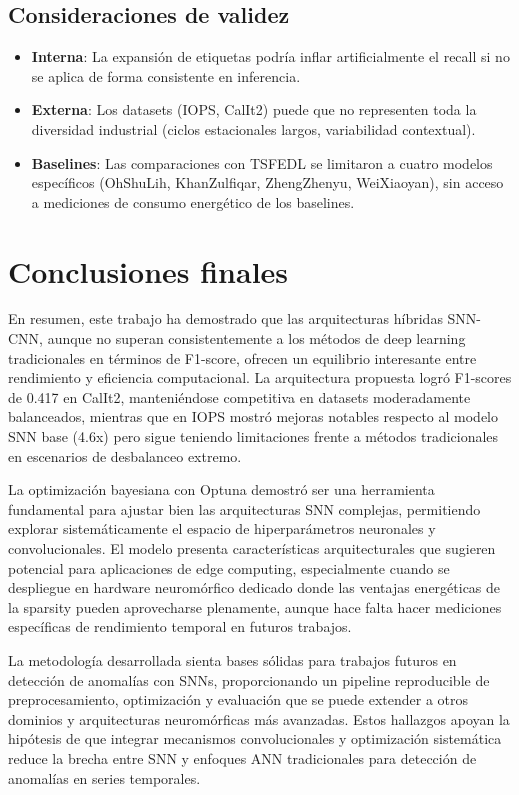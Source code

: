 \subsection{Consideraciones de validez}
\begin{itemize}
    \item \textbf{Interna}: La expansión de etiquetas podría inflar artificialmente el recall si no se aplica de forma consistente en inferencia.
    \item \textbf{Externa}: Los datasets (IOPS, CalIt2) puede que no representen toda la diversidad industrial (ciclos estacionales largos, variabilidad contextual).
    \item \textbf{Baselines}: Las comparaciones con TSFEDL se limitaron a cuatro modelos específicos (OhShuLih, KhanZulfiqar, ZhengZhenyu, WeiXiaoyan), sin acceso a mediciones de consumo energético de los baselines.
\end{itemize}

\section{Conclusiones finales}
En resumen, este trabajo ha demostrado que las arquitecturas híbridas SNN-CNN, aunque no superan consistentemente a los métodos de deep learning tradicionales en términos de F1-score, ofrecen un equilibrio interesante entre rendimiento y eficiencia computacional. La arquitectura propuesta logró F1-scores de 0.417 en CalIt2, manteniéndose competitiva en datasets moderadamente balanceados, mientras que en IOPS mostró mejoras notables respecto al modelo SNN base (4.6x) pero sigue teniendo limitaciones frente a métodos tradicionales en escenarios de desbalanceo extremo.

La optimización bayesiana con Optuna demostró ser una herramienta fundamental para ajustar bien las arquitecturas SNN complejas, permitiendo explorar sistemáticamente el espacio de hiperparámetros neuronales y convolucionales. El modelo presenta características arquitecturales que sugieren potencial para aplicaciones de edge computing, especialmente cuando se despliegue en hardware neuromórfico dedicado donde las ventajas energéticas de la sparsity pueden aprovecharse plenamente, aunque hace falta hacer mediciones específicas de rendimiento temporal en futuros trabajos.

La metodología desarrollada sienta bases sólidas para trabajos futuros en detección de anomalías con SNNs, proporcionando un pipeline reproducible de preprocesamiento, optimización y evaluación que se puede extender a otros dominios y arquitecturas neuromórficas más avanzadas.
Estos hallazgos apoyan la hipótesis de que integrar mecanismos convolucionales y optimización sistemática reduce la brecha entre SNN y enfoques ANN tradicionales para detección de anomalías en series temporales.

